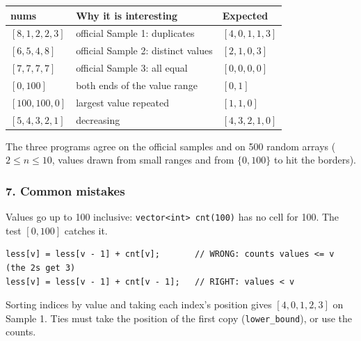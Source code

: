 \begin{testbox}
\centering\small
\begin{tabular}{@{}lll@{}}
\toprule
\textbf{nums} & \textbf{Why it is interesting} & \textbf{Expected} \\
\midrule
$[8,1,2,2,3]$ & official Sample 1: duplicates & $[4,0,1,1,3]$ \\
$[6,5,4,8]$ & official Sample 2: distinct values & $[2,1,0,3]$ \\
$[7,7,7,7]$ & official Sample 3: all equal & $[0,0,0,0]$ \\
$[0,100]$ & both ends of the value range & $[0,1]$ \\
$[100,100,0]$ & largest value repeated & $[1,1,0]$ \\
$[5,4,3,2,1]$ & decreasing & $[4,3,2,1,0]$ \\
\bottomrule
\end{tabular}

\medskip
The three programs agree on the official samples and on 500 random arrays ($2 \le n \le 10$, values drawn from small ranges and from $\{0, 100\}$ to hit the borders).
\end{testbox}

\subsubsection*{7. Common mistakes}

\begin{warningbox}
Values go up to 100 inclusive: \texttt{vector<int> cnt(100)} has no cell for 100. The test $[0,100]$ catches it.
\end{warningbox}

\begin{warningbox}
\begin{lstlisting}[style=snippet]
less[v] = less[v - 1] + cnt[v];       // WRONG: counts values <= v (the 2s get 3)
less[v] = less[v - 1] + cnt[v - 1];   // RIGHT: values < v
\end{lstlisting}
\end{warningbox}

\begin{warningbox}
Sorting indices by value and taking each index's position gives $[4,0,1,2,3]$ on Sample 1. Ties must take the position of the first copy (\texttt{lower\_bound}), or use the counts.
\end{warningbox}


